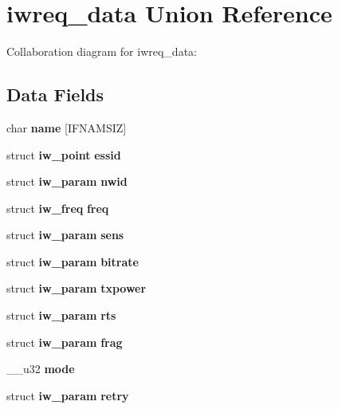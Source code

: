 \section{iwreq\-\_\-data \-Union \-Reference}
\label{unioniwreq__data}


\-Collaboration diagram for iwreq\-\_\-data\-:
\subsection*{\-Data \-Fields}
\begin{DoxyCompactItemize}
\item 
char {\bfseries name} [\-I\-F\-N\-A\-M\-S\-I\-Z]\label{unioniwreq__data_a9ea12d6fc5b2c586092468ee1a86162a}

\item 
struct {\bf iw\-\_\-point} {\bfseries essid}\label{unioniwreq__data_ac802630b8beb9a525fdecdbcd89886ce}

\item 
struct {\bf iw\-\_\-param} {\bfseries nwid}\label{unioniwreq__data_a9ee8b0661e10ba3458e718eb7a5afc56}

\item 
struct {\bf iw\-\_\-freq} {\bfseries freq}\label{unioniwreq__data_a61030d26c38ad8a4974677ded8539ffd}

\item 
struct {\bf iw\-\_\-param} {\bfseries sens}\label{unioniwreq__data_aeada6b86ba10cd42b611ea70b0cc20cf}

\item 
struct {\bf iw\-\_\-param} {\bfseries bitrate}\label{unioniwreq__data_a58cf69ce3c3de153f33f7bce3ad59c5f}

\item 
struct {\bf iw\-\_\-param} {\bfseries txpower}\label{unioniwreq__data_a434dc9e97fb3af89265adbe383c88f2a}

\item 
struct {\bf iw\-\_\-param} {\bfseries rts}\label{unioniwreq__data_ae05935cdb195dd4d0330b0f037789f87}

\item 
struct {\bf iw\-\_\-param} {\bfseries frag}\label{unioniwreq__data_ad2a2312877df544af7a54ff0c6d8fb83}

\item 
\-\_\-\-\_\-u32 {\bfseries mode}\label{unioniwreq__data_ac9de52fdeb11475b2586ed7969087b6e}

\item 
struct {\bf iw\-\_\-param} {\bfseries retry}\label{unioniwreq__data_a4e51e69fbb6ed1690b715218bbd6f614}


\end{DoxyCompactItemize}
